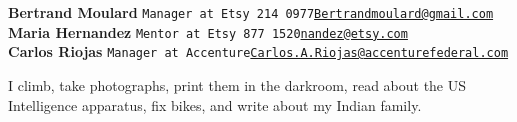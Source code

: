 \documentclass[9pt]{developercv} %
\begin{document}

    \large\textbf{Bertrand Moulard} \slashsep \large\texttt{Manager at Etsy 214 0977\slashsep\href{mailto:Bertrandmoulard@gmail.com}{Bertrandmoulard@gmail.com}}\\
    \large\textbf{Maria Hernandez} \slashsep \large\texttt{Mentor at Etsy 877 1520\slashsep\href{mailto:nandez@etsy.com}{nandez@etsy.com}}\\
    \large\textbf{Carlos Riojas} \slashsep \large\texttt{Manager at Accenture\slashsep\href{mailto:Carlos.A.Riojas@accenturefederal.com}{Carlos.A.Riojas@accenturefederal.com}}

\begin{minipage}[t]{0.45\textwidth}
    \vspace{-\baselineskip} %
    

    I climb, take photographs, print them in the darkroom, read about the US Intelligence apparatus, fix bikes, and write about my Indian family.
\end{minipage}
\hfill
\begin{minipage}[t]{0.45\textwidth}
    \vspace{-\baselineskip} %
\end{minipage}

\end{document}
